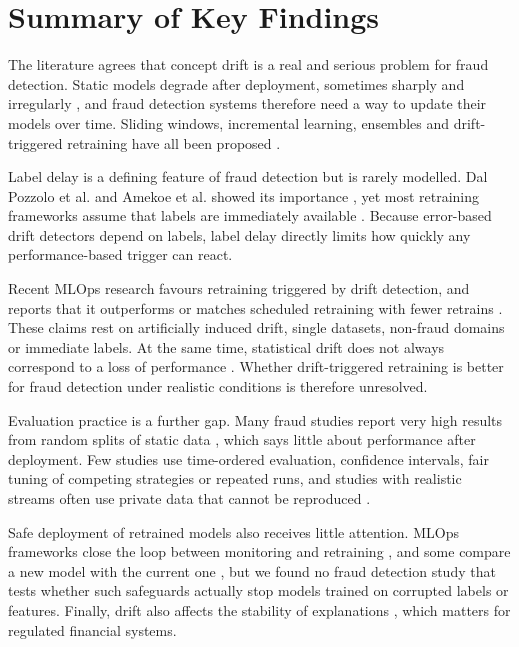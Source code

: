 \section{Summary of Key Findings}

The literature agrees that concept drift is a real and serious problem for fraud detection. Static models degrade after deployment, sometimes sharply and irregularly \cite{menezes2025,dalpozzolo2018}, and fraud detection systems therefore need a way to update their models over time. Sliding windows, incremental learning, ensembles and drift-triggered retraining have all been proposed \cite{dalpozzolo2018,somasundaram2019,yelleti2025,aldaoud2025,alessi2026}.

Label delay is a defining feature of fraud detection but is rarely modelled. Dal Pozzolo et al. and Amekoe et al. showed its importance \cite{dalpozzolo2018,amekoe2024}, yet most retraining frameworks assume that labels are immediately available \cite{shakil2025,wong2025,yelleti2025,kaushik2025}. Because error-based drift detectors depend on labels, label delay directly limits how quickly any performance-based trigger can react.

Recent MLOps research favours retraining triggered by drift detection, and reports that it outperforms or matches scheduled retraining with fewer retrains \cite{shakil2025,wong2025,yelleti2025}. These claims rest on artificially induced drift, single datasets, non-fraud domains or immediate labels. At the same time, statistical drift does not always correspond to a loss of performance \cite{shakil2025}. Whether drift-triggered retraining is better for fraud detection under realistic conditions is therefore unresolved.

Evaluation practice is a further gap. Many fraud studies report very high results from random splits of static data \cite{mienye2023,abdelnaby2023}, which says little about performance after deployment. Few studies use time-ordered evaluation, confidence intervals, fair tuning of competing strategies or repeated runs, and studies with realistic streams often use private data that cannot be reproduced \cite{dalpozzolo2018,somasundaram2019,aldaoud2025}.

Safe deployment of retrained models also receives little attention. MLOps frameworks close the loop between monitoring and retraining \cite{reda2025,kodakandla2024}, and some compare a new model with the current one \cite{wong2025}, but we found no fraud detection study that tests whether such safeguards actually stop models trained on corrupted labels or features. Finally, drift also affects the stability of explanations \cite{john2025,uddin2026}, which matters for regulated financial systems.

